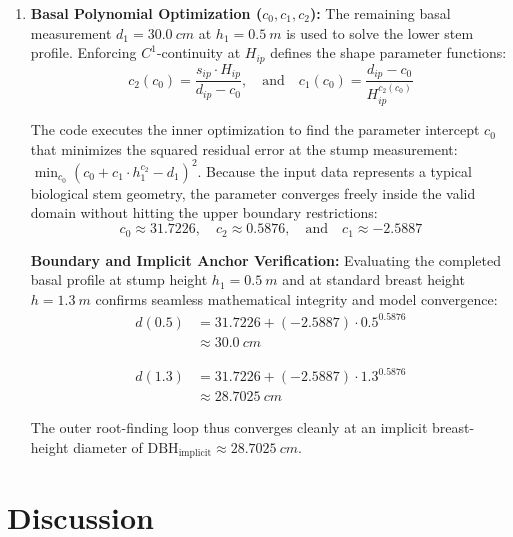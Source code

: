\documentclass[twocolumn, bibliography=totoc]{scrartcl}
\begin{document}
\begin{enumerate}
    \item \textbf{Basal Polynomial Optimization ($c_0, c_1, c_2$):} The remaining basal measurement $d_1 = \qty{30.0}{cm}$ at $h_1 = \qty{0.5}{m}$ is used to solve the lower stem profile. Enforcing $C^1$-continuity at $H_{ip}$ defines the shape parameter functions:
    \begin{equation}
        c_2(c_0) = \frac{s_{ip} \cdot H_{ip}}{d_{ip} - c_0}, \quad \text{and} \quad c_1(c_0) = \frac{d_{ip} - c_0}{H_{ip}^{c_2(c_0)}}
    \end{equation}
    
    The code executes the inner optimization to find the parameter intercept $c_0$ that minimizes the squared residual error at the stump measurement: $\min_{c_0} (c_0 + c_1 \cdot h_1^{c_2} - d_1)^2$. Because the input data represents a typical biological stem geometry, the parameter converges freely inside the valid domain without hitting the upper boundary restrictions:
    \begin{equation}
        c_0 \approx 31.7226, \quad c_2 \approx 0.5876, \quad \text{and} \quad c_1 \approx -2.5887
    \end{equation}

    \noindent \textbf{Boundary and Implicit Anchor Verification:} Evaluating the completed basal profile at stump height $h_1 = \qty{0.5}{m}$ and at standard breast height $h = \qty{1.3}{m}$ confirms seamless mathematical integrity and model convergence:
    \begin{equation}
\begin{aligned}
    d(0.5) &= 31.7226 + (-2.5887) \cdot 0.5^{0.5876} \\
    &\approx \qty{30.0}{cm}
\end{aligned}
\end{equation}

\begin{equation}
\begin{aligned}
    d(1.3) &= 31.7226 + (-2.5887) \cdot 1.3^{0.5876} \\
    &\approx \qty{28.7025}{cm}
\end{aligned}
\end{equation}
   
    The outer root-finding loop thus converges cleanly at an implicit breast-height diameter of $\text{DBH}_{\text{implicit}} \approx \qty{28.7025}{cm}$.
\end{enumerate}


\section{Discussion}
\end{document}
